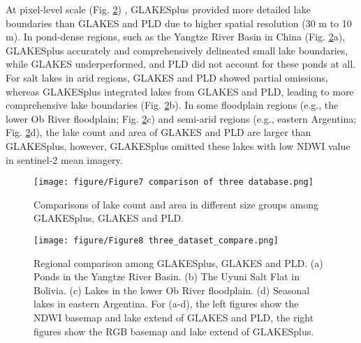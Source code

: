 \documentclass[preprint,12pt,authoryear]{elsarticle}
\begin{document}
At pixel-level scale (Fig. \ref{fig:Fig8}) , GLAKESplus provided more detailed lake boundaries than GLAKES and PLD due to higher spatial resolution (30 m to 10 m). In pond-dense regions, such as the Yangtze River Basin in China (Fig. \ref{fig:Fig8}a), GLAKESplus accurately and comprehensively delineated small lake boundaries, while GLAKES underperformed, and PLD did not account for these ponds at all. For salt lakes in arid regions, GLAKES and PLD showed partial omissions, whereas GLAKESplus integrated lakes from GLAKES and PLD, leading to more comprehensive lake boundaries (Fig. \ref{fig:Fig8}b). In some floodplain regions (e.g., the lower Ob River floodplain; Fig. \ref{fig:Fig8}c) and semi-arid regions (e.g., eastern Argentina; Fig. \ref{fig:Fig8}d), the lake count and area of GLAKES and PLD are larger than GLAKESplus, however, GLAKESplus omitted these lakes with low NDWI value in sentinel-2 mean imagery.

\begin{figure}[h]
    \centering
    \texttt{[image: figure/Figure7 comparison of three database.png]}
    \caption{Comparisons of lake count and area in different size groups among GLAKESplus, GLAKES and PLD.}
    \label{fig:Fig7}
\end{figure}

\begin{figure}[h]
    \centering
    \texttt{[image: figure/Figure8 three\_dataset\_compare.png]}
    \caption{Regional comparison among GLAKESplus, GLAKES and PLD. (a) Ponds in the Yangtze River Basin. (b) The Uyuni Salt Flat in Bolivia. (c) Lakes in the lower Ob River floodplain. (d) Seasonal lakes in eastern Argentina. For (a-d), the left figures show the NDWI basemap and lake extend of GLAKES and PLD, the right figures show the RGB basemap and lake extend of GLAKESplus.}
    \label{fig:Fig8}
\end{figure}
\end{document}
